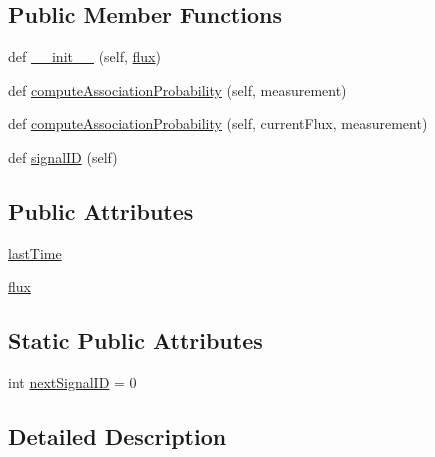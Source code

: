 \subsection*{Public Member Functions}
\begin{DoxyCompactItemize}
\item 
def \hyperlink{classmodest_1_1signals_1_1PoissonSource_1_1StaticPoissonSource_ac7338890a4a12ae9bb3806fba249f03d}{\+\_\+\+\_\+init\+\_\+\+\_\+} (self, \hyperlink{classmodest_1_1signals_1_1PoissonSource_1_1PoissonSource_ae0a95ae74b0d1df57ed10a7eeb8fa754}{flux})
\item 
def \hyperlink{classmodest_1_1signals_1_1PoissonSource_1_1StaticPoissonSource_aa22c2473489750cde71c7bd3792a774d}{compute\+Association\+Probability} (self, measurement)
\item 
def \hyperlink{classmodest_1_1signals_1_1PoissonSource_1_1PoissonSource_a86d80fd2ac349efd7df5184800afe7da}{compute\+Association\+Probability} (self, current\+Flux, measurement)
\item 
def \hyperlink{classmodest_1_1signals_1_1SignalSource_1_1SignalSource_af652db2ed97925595d650fd909d6a2d4}{signal\+ID} (self)
\end{DoxyCompactItemize}
\subsection*{Public Attributes}
\begin{DoxyCompactItemize}
\item 
\hyperlink{classmodest_1_1signals_1_1PoissonSource_1_1PoissonSource_a982ffe5add48d52a24d16483c7a26a5b}{last\+Time}
\item 
\hyperlink{classmodest_1_1signals_1_1PoissonSource_1_1PoissonSource_ae0a95ae74b0d1df57ed10a7eeb8fa754}{flux}
\end{DoxyCompactItemize}
\subsection*{Static Public Attributes}
\begin{DoxyCompactItemize}
\item 
int \hyperlink{classmodest_1_1signals_1_1SignalSource_1_1SignalSource_a7a87b05025246170067fbf9ed3ef49fd}{next\+Signal\+ID} = 0
\end{DoxyCompactItemize}


\subsection{Detailed Description}



